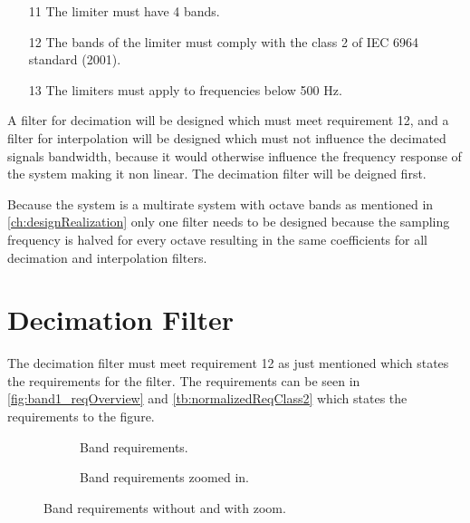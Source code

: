 \vspace*{-5mm}
\begin{enumerate}
\item[11] The limiter must have 4 bands.
\item[12] The bands of the limiter must comply with the class 2 of IEC 6964 standard (2001). 
\item[13] The limiters must apply to frequencies below 500 Hz.
\end{enumerate}

\vspace*{-5mm}
A filter for decimation will be designed which must meet requirement 12, and a filter for interpolation will be designed which must not influence the decimated signals bandwidth, because it would otherwise influence the frequency response of the system making it non linear. The decimation filter will be deigned first.

Because the system is a multirate system with octave bands as mentioned in \autoref{ch:designRealization} only one filter needs to be designed because the sampling frequency is halved for every octave resulting in the same coefficients for all decimation and interpolation filters.

\section{Decimation Filter}\label{sec:decFilter}
The decimation filter must meet requirement 12 as just mentioned which states the requirements for the filter. The requirements can be seen in \autoref{fig:band1_reqOverview} and \autoref{tb:normalizedReqClass2} which states the requirements to the figure.

\begin{figure}[H]
\centering
\begin{subfigure}[t]{0.45\textwidth}
	
	\caption{Band requirements.}
	\label{fig:band1_req}
\end{subfigure}
\begin{subfigure}[t]{0.45\textwidth}
	
	\caption{Band requirements zoomed in.}
	\label{fig:band1_reqZoom}
\end{subfigure}
\caption{Band requirements without and with zoom.}
\label{fig:band1_reqOverview}
\end{figure}


